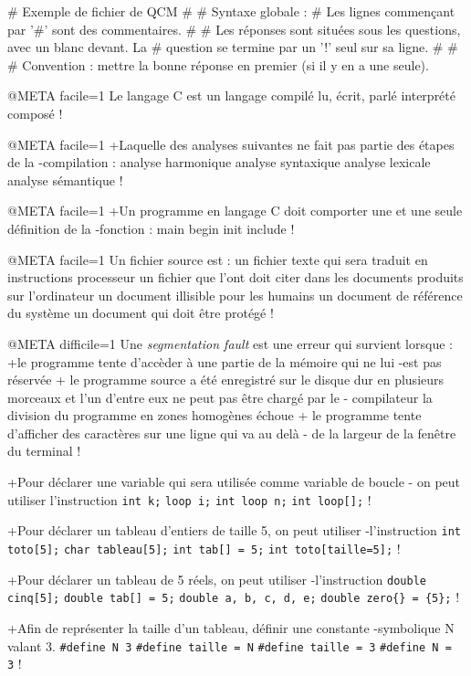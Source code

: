 # Exemple de fichier de QCM
#
# Syntaxe globale :
# Les lignes commençant par '#' sont des commentaires.
#
# Les réponses sont situées sous les questions, avec un blanc devant. La
# question se termine par un '!' seul sur sa ligne.
#
#
# Convention : mettre la bonne réponse en premier (si il y en a une seule).

@META facile=1
Le langage C est un langage
 compilé
 lu, écrit, parlé
 interprété
 composé
!

@META facile=1
+Laquelle des analyses suivantes ne fait pas partie des étapes de la
-compilation :
 analyse harmonique
 analyse syntaxique
 analyse lexicale
 analyse sémantique
!

@META facile=1
+Un programme en langage C doit comporter une et une seule définition de la
-fonction :
 main
 begin
 init
 include
!

@META facile=1
Un fichier source est :
 un fichier texte qui sera traduit en instructions processeur
 un fichier que l'ont doit citer dans les documents produits sur l'ordinateur
 un document illisible pour les humains
 un document de référence du système
 un document qui doit être protégé
!

@META difficile=1
Une \emph{segmentation fault} est une erreur qui survient lorsque :
+le programme tente d'accèder à une partie de la mémoire qui ne lui
-est pas réservée
+ le programme source a été enregistré sur le disque dur en plusieurs
  morceaux et l'un d'entre eux ne peut pas être chargé par le
- compilateur
 la division du programme en zones homogènes échoue
+ le programme tente d'afficher des caractères sur une ligne qui va au delà
- de la largeur de la fenêtre du terminal
!

+Pour déclarer une variable qui sera utilisée comme variable de boucle
- on peut utiliser l'instruction
  \verb|int k;|
  \verb|loop i;|
  \verb|int loop n;|
  \verb|int loop[];|
!

+Pour déclarer un tableau d'entiers de taille 5, on peut utiliser
-l'instruction
 \verb|int toto[5];|
 \verb|char tableau[5];|
 \verb|int tab[] = 5;|
 \verb|int toto[taille=5];|
!

+Pour déclarer un tableau de 5 réels, on peut utiliser
-l'instruction
 \verb|double cinq[5];|
 \verb|double tab[] = 5;|
 \verb|double a, b, c, d, e;|
 \verb|double zero{} = {5};|
!

+Afin de représenter la taille d'un tableau, définir une constante
-symbolique N valant 3.
 \verb|#define N 3|
 \verb|#define taille = N|
 \verb|#define taille = 3|
 \verb|#define N =  3|
!

